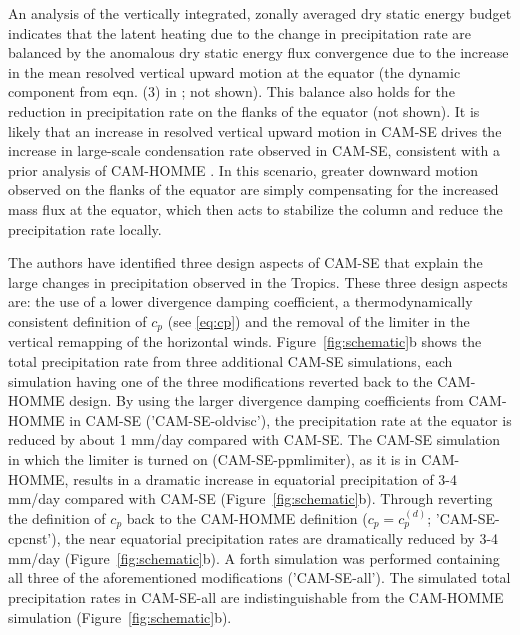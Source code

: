 An analysis of the vertically integrated, zonally averaged dry static energy budget indicates that the latent heating due to the change in precipitation rate are balanced by the anomalous dry static energy flux convergence due to the increase in the mean resolved vertical upward motion at the equator (the dynamic component from eqn. (3) in \cite{MO2011NATUREC}; not shown). This balance also holds for the reduction in precipitation rate on the flanks of the equator (not shown). It is likely that an increase in resolved vertical upward motion in CAM-SE drives the increase in large-scale condensation rate observed in CAM-SE, consistent with a prior analysis of CAM-HOMME \citep{OETAL2016JAMES}. In this scenario, greater downward motion observed on the flanks of the equator are simply compensating for the increased mass flux at the equator, which then acts to stabilize the column and reduce the precipitation rate locally.

The authors have identified three design aspects of CAM-SE that explain the large changes in precipitation observed in the Tropics. These three design aspects are: the use of a lower divergence damping coefficient, a thermodynamically consistent definition of $c_p$ (see \eqref{eq:cp}) and the removal of the limiter in the vertical remapping of the horizontal winds. Figure~\ref{fig:schematic}b shows the total precipitation rate from three additional CAM-SE simulations, each simulation having one of the three modifications reverted back to the CAM-HOMME design. By using the larger divergence damping coefficients from CAM-HOMME in CAM-SE ('CAM-SE-oldvisc'), the precipitation rate at the equator is reduced by about 1 mm/day compared with CAM-SE. The CAM-SE simulation in which the limiter is turned on (CAM-SE-ppmlimiter), as it is in CAM-HOMME, results in a dramatic increase in equatorial precipitation of 3-4 mm/day compared with CAM-SE (Figure~\ref{fig:schematic}b). Through reverting the definition of $c_p$ back to the CAM-HOMME definition ($c_p = c_p^{(d)}$; 'CAM-SE-cpcnst'), the near equatorial precipitation rates are dramatically reduced by 3-4 mm/day (Figure~\ref{fig:schematic}b). A forth simulation was performed containing all three of the aforementioned modifications ('CAM-SE-all'). The simulated total precipitation rates in CAM-SE-all are indistinguishable from the CAM-HOMME simulation (Figure~\ref{fig:schematic}b).
 

